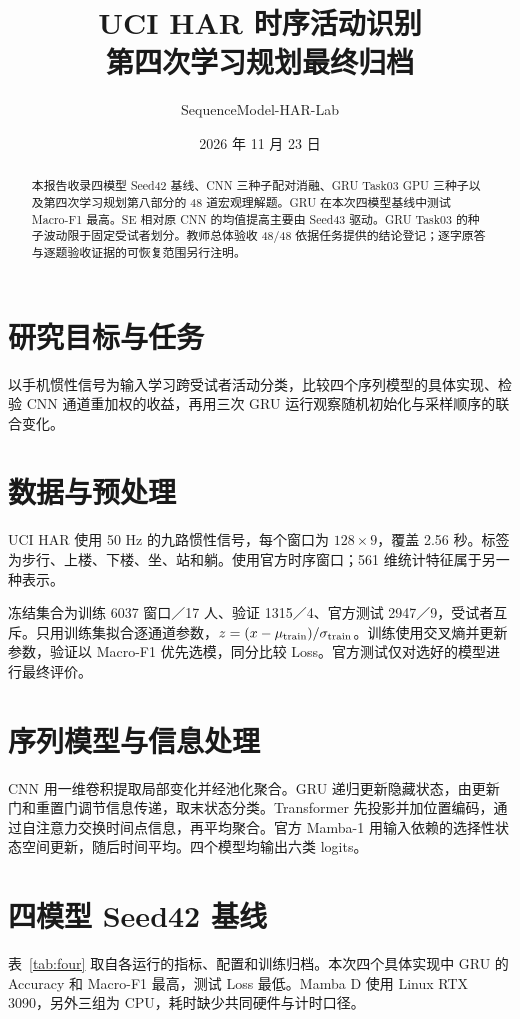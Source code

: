 \documentclass[UTF8,a4paper,11pt,fontset=none]{ctexart}
\title{\textbf{UCI HAR 时序活动识别}\\[4pt]\large 第四次学习规划最终归档}
\author{SequenceModel-HAR-Lab}
\date{2026 年 11 月 23 日}
\begin{document}
\maketitle

\begin{abstract}
本报告收录四模型 Seed42 基线、CNN 三种子配对消融、GRU Task03 GPU 三种子以及第四次学习规划第八部分的 48 道宏观理解题。GRU 在本次四模型基线中测试 Macro-F1 最高。SE 相对原 CNN 的均值提高主要由 Seed43 驱动。GRU Task03 的种子波动限于固定受试者划分。教师总体验收 48/48 依据任务提供的结论登记；逐字原答与逐题验收证据的可恢复范围另行注明。
\end{abstract}

\section{研究目标与任务}
以手机惯性信号为输入学习跨受试者活动分类，比较四个序列模型的具体实现、检验 CNN 通道重加权的收益，再用三次 GRU 运行观察随机初始化与采样顺序的联合变化。

\section{数据与预处理}
UCI HAR 使用 50 Hz 的九路惯性信号，每个窗口为 \(128\times9\)，覆盖 2.56 秒。标签为步行、上楼、下楼、坐、站和躺。使用官方时序窗口；561 维统计特征属于另一种表示。\cite{uci,protocol}

冻结集合为训练 6037 窗口／17 人、验证 1315／4、官方测试 2947／9，受试者互斥。只用训练集拟合逐通道参数，\(z=(x-\mu_{\rm train})/\sigma_{\rm train}\)。训练使用交叉熵并更新参数，验证以 Macro-F1 优先选模，同分比较 Loss。官方测试仅对选好的模型进行最终评价。

\section{序列模型与信息处理}
CNN 用一维卷积提取局部变化并经池化聚合。GRU 递归更新隐藏状态，由更新门和重置门调节信息传递，取末状态分类。Transformer 先投影并加位置编码，通过自注意力交换时间点信息，再平均聚合。官方 Mamba-1 用输入依赖的选择性状态空间更新，随后时间平均。四个模型均输出六类 logits。

\clearpage
\section{四模型 Seed42 基线}
表~\ref{tab:four} 取自各运行的指标、配置和训练归档。本次四个具体实现中 GRU 的 Accuracy 和 Macro-F1 最高，测试 Loss 最低。Mamba D 使用 Linux RTX 3090，另外三组为 CPU，耗时缺少共同硬件与计时口径。\cite{four}
\end{document}
